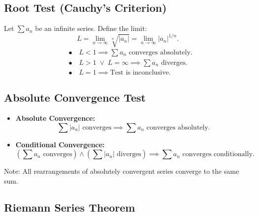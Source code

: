 \documentclass[a4paper,11pt]{article}
\begin{document}


\subsection{Root Test (Cauchy's Criterion)}

\begin{tcolorbox}
    Let $\textstyle \sum a_n$ be an infinite series. Define the limit:
    \[
    L = \lim_{n \to \infty} \sqrt[n]{ \left| a_n \right| } = \lim_{n \to \infty} { \left| a_n \right| } ^ {1/n}.
    \]
    \[
    \begin{aligned}
        &\bullet \quad L < 1 \implies \sum a_n \text{ converges absolutely}. \\[8pt]  
        &\bullet \quad L > 1 \; \lor \; L = \infty \implies \sum a_n \text{ diverges}. \\[8pt]
        &\bullet \quad L = 1 \implies \text{Test is inconclusive}.
    \end{aligned}
    \]
\end{tcolorbox}




\subsection{Absolute Convergence Test}

\begin{tcolorbox}
    \begin{itemize}
        \item \textbf{Absolute Convergence:}
        \[
        \sum \left| a_n \right| \text{ converges} \implies \sum a_n \text{ converges absolutely}.
        \]
        \item \textbf{Conditional Convergence:}
        \[
        \left(\sum a_n \text{ converges} \right) \land \left(\sum \left| a_n \right| \text{ diverges} \right) \implies \sum a_n \text{ converges conditionally}.
        \]        
    \end{itemize}
    Note: All rearrangements of absolutely convergent series converge to the same sum.
\end{tcolorbox}




\subsection{Riemann Series Theorem}
\end{document}
